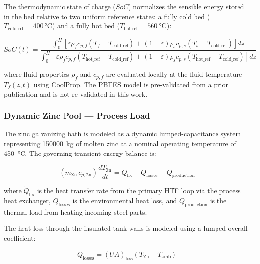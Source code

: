 \documentclass[11pt,review,3p]{elsarticle}
\begin{document}
The thermodynamic state of charge ($SoC$) normalizes the sensible energy stored in the bed relative to two uniform reference states: a fully cold bed ($T_{\text{cold\_ref}} = \SI{400}{\celsius}$) and a fully hot bed ($T_{\text{hot\_ref}} = \SI{560}{\celsius}$):

\begin{equation}
    SoC(t) = \frac{\displaystyle\int_0^H \left[ \varepsilon \rho_f c_{p,f} (T_f - T_{\text{cold\_ref}}) + (1-\varepsilon) \rho_s c_{p,s} (T_s - T_{\text{cold\_ref}}) \right] dz}
                  {\displaystyle\int_0^H \left[ \varepsilon \rho_f c_{p,f} (T_{\text{hot\_ref}} - T_{\text{cold\_ref}}) + (1-\varepsilon) \rho_s c_{p,s} (T_{\text{hot\_ref}} - T_{\text{cold\_ref}}) \right] dz}
    \label{eq:soc}
\end{equation}

where fluid properties $\rho_f$ and $c_{p,f}$ are evaluated locally at the fluid temperature $T_f(z,t)$ using CoolProp. The PBTES model is pre-validated from a prior publication and is not re-validated in this work.

\subsubsection{Dynamic Zinc Pool --- Process Load}
\label{sec:zinc_model}

The zinc galvanizing bath is modeled as a dynamic lumped-capacitance system representing \SI{150000}{kg} of molten zinc at a nominal operating temperature of \SI{450}{\celsius}. The governing transient energy balance is:

\begin{equation}
    \left(m_{\text{Zn}} \, c_{p,\text{Zn}}\right) \frac{dT_{\text{Zn}}}{dt} = \dot{Q}_{\text{hx}} - \dot{Q}_{\text{losses}} - \dot{Q}_{\text{production}}
    \label{eq:zinc_energy}
\end{equation}

where $\dot{Q}_{\text{hx}}$ is the heat transfer rate from the primary HTF loop via the process heat exchanger, $\dot{Q}_{\text{losses}}$ is the environmental heat loss, and $\dot{Q}_{\text{production}}$ is the thermal load from heating incoming steel parts.

The heat loss through the insulated tank walls is modeled using a lumped overall coefficient:

\begin{equation}
    \dot{Q}_{\text{losses}} = (UA)_{\text{loss}} \left(T_{\text{Zn}} - T_{\text{amb}}\right)
    \label{eq:zinc_loss}
\end{equation}
\end{document}
